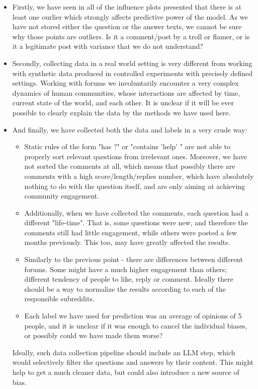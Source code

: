 \documentclass[11pt, oneside]{article}   	%
\begin{document}
\begin{itemize}
    \item Firstly, we have seen in all of the influence plots presented that there is at least one ourlier which strongly affects predictive power of the model. As we have not stored either the question or the answer texts, we cannot be sure why those points are outliers. Is it a comment/post by a troll or flamer, or is it a legitimate post with variance that we do not understand?
    \item Secondly, collecting data in a real world setting is very different from working with synthetic data produced in controlled experiments with precisely defined settings. Working with forums we involuntarily encounter a very complex dynamics of human communities, whose interactions are affected by time, current state of the world, and each other. It is unclear if it will be ever possible to clearly explain the data by the methods we have used here.
    \item And finally, we have collected both the data and labels in a very crude way: 
    \begin{itemize}
        \item Static rules of the form "has ?" or "contains 'help' " are not able to properly sort relevant questions from irrelevant ones. Moreover, we have not sorted the comments at all, which means that possibly there are comments with a high score/length/replies number, which have absolutely nothing to do with the question itself, and are only aiming at achieving community engagement.
        \item Additionally, when we have collected the comments, each question had a different "life-time". That is, some questions were new, and therefore the comments still had little engagement, while others were posted a few months previously. This too, may have greatly affected the results.
        \item Similarly to the previous point - there are differences between different forums. Some might have a much higher engagement than others; different tendency of people to like, reply or comment. Ideally there should be a way to normalize the results according to each of the responsible subreddits.
        \item Each label we have used for prediction was an average of opinions of 5 people, and it is unclear if it was enough to cancel the individual biases, or possibly could we have made them worse?\\
    \end{itemize}
    Ideally, such data collection pipeline should include an LLM step, which would selectively filter the questions and answers by their content. This might help to get a much cleaner data, but could also introduce a new source of bias.
\end{itemize}
\end{document}
